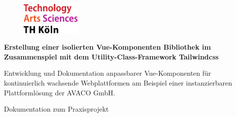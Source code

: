 \begin{titlepage}

\begin{center}

\begin{figure}[!ht]
		\includegraphics[width=0.26\textwidth]{images/THlogoheader.pdf}
\end{figure}

\vspace{1.5cm}

\begin{rmfamily}
\begin{huge}
\textbf{ Erstellung einer isolierten Vue-Komponenten Bibliothek im Zusammenspiel mit dem Utility-Class-Framework Tailwindcss}\\	
\end{huge}
\vspace{0.5cm}
\begin{LARGE}
	Entwicklung und Dokumentation anpassbarer Vue-Komponenten für kontinuierlich wachsende Webplattformen am Beispiel einer instanzierbaren Plattformlösung der AVACO GmbH. \\
\end{LARGE}
\end{rmfamily}

\vspace{0.8cm}



\begin{LARGE}
\begin{scshape}
Dokumentation zum Praxisprojekt\\[0.8em]
\end{scshape}
\end{LARGE}


\end{center}
\end{titlepage}
